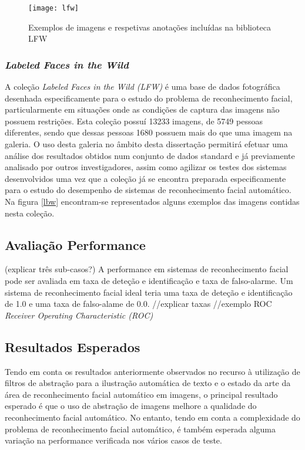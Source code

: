 \begin{figure}[t]
  \begin{center}
    \leavevmode
    \texttt{[image: lfw]}
    \caption{Exemplos de imagens e respetivas anotações incluídas na biblioteca LFW}	
    \label{fig:lfwimagem}
  \end{center}
\end{figure}

\subsubsection{\textit{Labeled Faces in the Wild}}
A coleção \textit{Labeled Faces in the Wild (LFW)} é uma base de dados fotográfica desenhada especificamente para o estudo do problema de reconhecimento facial, particularmente em situações onde as condições de captura das imagens não possuem restrições. Esta coleção possuí 13233 imagens, de 5749 pessoas diferentes, sendo que dessas pessoas 1680 possuem mais do que uma imagem na galeria. O uso desta galeria no âmbito desta dissertação permitirá efetuar uma análise dos resultados obtidos num conjunto de dados standard e já previamente analisado por outros investigadores, assim como agilizar os testes dos sistemas desenvolvidos uma vez que a coleção já se encontra preparada especificamente para o estudo do desempenho de sistemas de reconhecimento facial automático. Na figura \ref{lbw} encontram-se representados alguns exemplos das imagens contidas nesta coleção.

\subsection{Avaliação Performance}
(explicar três sub-casos?)
A performance em sistemas de reconhecimento facial pode ser avaliada em taxa de deteção e identificação e taxa de falso-alarme. Um sistema de reconhecimento facial ideal teria uma taxa de deteção e identificação de 1.0 e uma taxa de falso-alame de 0.0.
//explicar taxas
//exemplo ROC 
\textit{Receiver Operating Characteristic (ROC)}



\subsection{Resultados Esperados}
Tendo em conta os resultados anteriormente observados no recurso à utilização de filtros de abstração para a ilustração automática de texto e o estado da arte da área de reconhecimento facial automático em imagens, o principal resultado esperado é que o uso de abstração de imagens melhore a qualidade do reconhecimento facial automático. No entanto, tendo em conta a complexidade do problema de reconhecimento facial automático, é também esperada alguma variação na performance verificada nos vários casos de teste.

